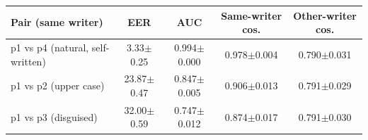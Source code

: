 \begin{tabular}{lcccc}
\toprule
Pair (same writer) & EER & AUC & Same-writer cos. & Other-writer cos. \\
\midrule
p1 vs p4 (natural, self-written) & 3.33$\pm$0.25 & 0.994$\pm$0.000 & 0.978$\pm$0.004 & 0.790$\pm$0.031 \\
p1 vs p2 (upper case) & 23.87$\pm$0.47 & 0.847$\pm$0.005 & 0.906$\pm$0.013 & 0.791$\pm$0.029 \\
p1 vs p3 (disguised) & 32.00$\pm$0.59 & 0.747$\pm$0.012 & 0.874$\pm$0.017 & 0.791$\pm$0.030 \\
\bottomrule
\end{tabular}
